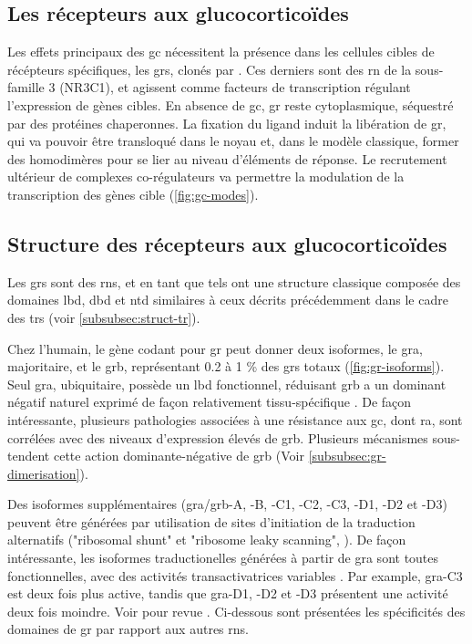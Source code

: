 \documentclass[../main.tex]{subfiles}
\begin{document}
\subsection{Les récepteurs aux glucocorticoïdes}
Les effets principaux des \gls{gc} nécessitent la présence dans les cellules cibles de récépteurs spécifiques, les \glspl{gr}, clonés par \citep{Weinberger1985}.
Ces derniers sont des \gls{rn} de la sous-famille 3 (NR3C1), et agissent comme facteurs de transcription régulant l'expression de gènes cibles.
En absence de \gls{gc}, \gls{gr} reste cytoplasmique, séquestré par des protéines chaperonnes.
La fixation du ligand induit la libération de \gls{gr}, qui va pouvoir être transloqué dans le noyau et, dans le modèle classique, former des homodimères pour se lier au niveau d'éléments de réponse.
Le recrutement ultérieur de complexes co-régulateurs va permettre la modulation de la transcription des gènes cible (\autoref{fig:gc-modes}).




\subsection{Structure des récepteurs aux glucocorticoïdes}
Les \glspl{gr} sont des \glspl{rn}, et en tant que tels ont une structure classique composée des domaines \gls{lbd}, \gls{dbd} et \gls{ntd} similaires à ceux décrits précédemment dans le cadre des \glspl{tr} (voir \autoref{subsubsec:struct-tr}).

Chez l'humain, le gène codant pour \gls{gr} peut donner deux isoformes, le \gls{gra}, majoritaire, et le \gls{grb}, représentant 0.2 à 1 \% des \glspl{gr} totaux (\autoref{fig:gr-isoforms}).
Seul \gls{gra}, ubiquitaire, possède un \gls{lbd} fonctionnel, réduisant \gls{grb} a un dominant négatif naturel exprimé de façon relativement tissu-spécifique \citep{Lu2004}.
De façon intéressante, plusieurs pathologies associées à une résistance aux \gls{gc}, dont \gls{ra}, sont corrélées avec des niveaux d'expression élevés de \gls{grb}.
Plusieurs mécanismes sous-tendent cette action dominante-négative de \gls{grb} (Voir \autoref{subsubsec:gr-dimerisation}).

Des isoformes supplémentaires (\gls{gra}/\gls{grb}-A, -B, -C1, -C2, -C3, -D1, -D2 et -D3) peuvent être générées par utilisation de sites d'initiation de la traduction alternatifs ("ribosomal shunt" et "ribosome leaky scanning", \citealp{Lu2005}).
De façon intéressante, les isoformes traductionelles générées à partir de \gls{gra} sont toutes fonctionnelles, avec des activités transactivatrices variables \citep{Lu2005}.
Par example, \gls{gra}-C3 est deux fois plus active, tandis que \gls{gra}-D1, -D2 et -D3 présentent une activité deux fois moindre.
Voir pour revue \citep{Lu2006}.
Ci-dessous sont présentées les spécificités des domaines de \gls{gr} par rapport aux autres \glspl{rn}.
\end{document}

